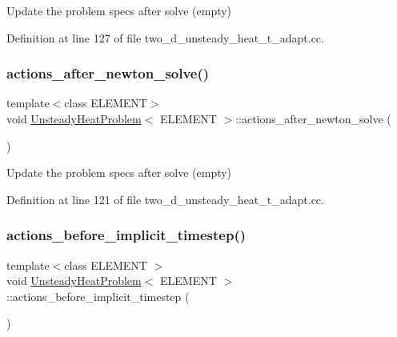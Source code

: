 Update the problem specs after solve (empty) 



Definition at line 127 of file two\+\_\+d\+\_\+unsteady\+\_\+heat\+\_\+t\+\_\+adapt.\+cc.

\mbox{\label{classUnsteadyHeatProblem_a88e3d534b5904f7c10ce6a8fbd6df0ea}} 
\subsubsection{\texorpdfstring{actions\+\_\+after\+\_\+newton\+\_\+solve()}{actions\_after\_newton\_solve()}}
{\footnotesize\ttfamily template$<$class E\+L\+E\+M\+E\+NT$>$ \\
void \hyperlink{classUnsteadyHeatProblem}{Unsteady\+Heat\+Problem}$<$ E\+L\+E\+M\+E\+NT $>$\+::actions\+\_\+after\+\_\+newton\+\_\+solve (\begin{DoxyParamCaption}{ }\end{DoxyParamCaption})\hspace{0.3cm}{\ttfamily [inline]}}



Update the problem specs after solve (empty) 



Definition at line 121 of file two\+\_\+d\+\_\+unsteady\+\_\+heat\+\_\+t\+\_\+adapt.\+cc.

\mbox{\label{classUnsteadyHeatProblem_a7074e52f6a3a791549687e1b4ddd059a}} 
\subsubsection{\texorpdfstring{actions\+\_\+before\+\_\+implicit\+\_\+timestep()}{actions\_before\_implicit\_timestep()}}
{\footnotesize\ttfamily template$<$class E\+L\+E\+M\+E\+NT $>$ \\
void \hyperlink{classUnsteadyHeatProblem}{Unsteady\+Heat\+Problem}$<$ E\+L\+E\+M\+E\+NT $>$\+::actions\+\_\+before\+\_\+implicit\+\_\+timestep (\begin{DoxyParamCaption}{ }\end{DoxyParamCaption})}



